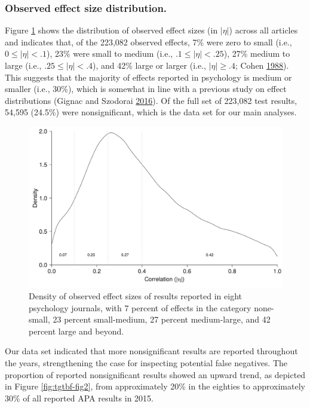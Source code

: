 \documentclass[a5paper]{book}
\begin{document}
\subsubsection{Observed effect size
distribution.}\label{observed-effect-size-distribution.}

Figure \ref{fig:tgtbf-fig1} shows the distribution of observed effect
sizes (in \(|\eta|\)) across all articles and indicates that, of the
223,082 observed effects, 7\% were zero to small (i.e.,
\(0\leq|\eta|<.1\)), 23\% were small to medium (i.e.,
\(.1\leq|\eta|<.25\)), 27\% medium to large (i.e.,
\(.25\leq|\eta|<.4\)), and 42\% large or larger (i.e., \(|\eta|\geq.4\);
Cohen \protect\hyperlink{ref-isbn:9780805802832}{1988}). This suggests
that the majority of effects reported in psychology is medium or smaller
(i.e., 30\%), which is somewhat in line with a previous study on effect
distributions (Gignac and Szodorai
\protect\hyperlink{ref-doi:10.1016ux2fj.paid.2016.06.069}{2016}). Of the
full set of 223,082 test results, 54,595 (24.5\%) were nonsignificant,
which is the data set for our main analyses.

\begin{figure}[h]

{\centering \includegraphics[width=1\linewidth]{assets/figures/tgtbf-fig1.pdf.svg} 

}

\caption{Density of observed effect sizes of results reported in eight psychology journals, with 7 percent of effects in the category none-small, 23 percent small-medium, 27 percent medium-large, and 42 percent large and beyond.}\label{fig:tgtbf-fig1}
\end{figure}

Our data set indicated that more nonsignificant results are reported
throughout the years, strengthening the case for inspecting potential
false negatives. The proportion of reported nonsignificant results
showed an upward trend, as depicted in Figure \ref{fig:tgtbf-fig2}, from
approximately 20\% in the eighties to approximately 30\% of all reported
APA results in 2015.
\end{document}
